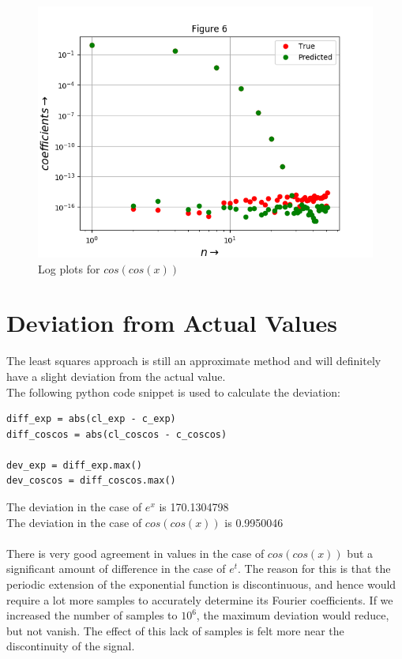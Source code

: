 \documentclass[11pt, a4paper]{article}
\begin{document}
   \begin{figure}[!tbh]
   	\centering
   	\includegraphics[scale=0.6]{Figure_10.png}   
   	\caption{Log plots for $cos(cos(x))$}
   	\label{fig:sample}
   \end{figure} 
     
\section{Deviation from Actual Values} 
The least squares approach is still an approximate method and will definitely have a slight deviation from the actual value.\\
The following python code snippet is used to calculate the deviation:
\begin{verbatim}	
diff_exp = abs(cl_exp - c_exp)
diff_coscos = abs(cl_coscos - c_coscos)

dev_exp = diff_exp.max()
dev_coscos = diff_coscos.max()
\end{verbatim}
The deviation in the case of $e^{x}$ is 170.1304798\\
The deviation in the case of $cos(cos(x))$ is 0.9950046\\\\
There is very good agreement in values in the case of $cos(cos(x))$ but a significant amount of difference in the case of $e^{t}$. The reason for this is that the periodic extension of the exponential function is discontinuous, and hence would require a lot more samples to accurately determine its Fourier coefficients. If we increased the number of samples to $10^{6}$, the maximum deviation would reduce, but not vanish.
The effect of this lack of samples is felt more near the discontinuity of the signal.
\end{document}
